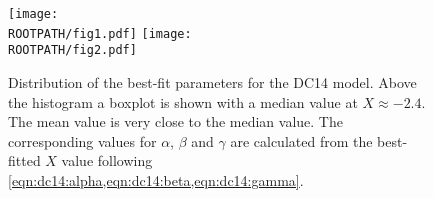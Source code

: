 \begin{figure}
	\centering%
	\texttt{[image: \\ROOTPATH/fig1.pdf]}
	\texttt{[image: \\ROOTPATH/fig2.pdf]}
	\caption{Distribution of the best-fit parameters for the DC14 model. Above the histogram a boxplot is shown with a median value at $X \approx -2.4$. The mean value is very close to the median value. The corresponding values for $\alpha$, $\beta$ and $\gamma$ are calculated from the best-fitted $X$ value following \cref{eqn:dc14:alpha,eqn:dc14:beta,eqn:dc14:gamma}.}%
	\label{fig:parameter-distribution:dc14}%
\end{figure}